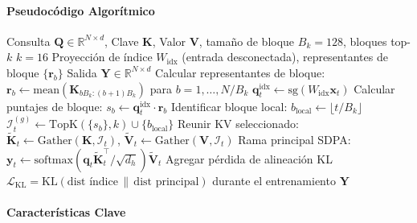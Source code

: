 \paragraph{Pseudocódigo Algorítmico}

\begin{algorithm}[H]
\caption{MSA: Atención Dispersa MiniMax con Ramas de Índice + Principal}
\begin{algorithmic}[1]
\Require Consulta $\mathbf{Q} \in \mathbb{R}^{N \times d}$, Clave $\mathbf{K}$, Valor $\mathbf{V}$, tamaño de bloque $B_k = 128$, bloques top-$k$ $k = 16$
\Require Proyección de índice $W_{\text{idx}}$ (entrada desconectada), representantes de bloque $\{\mathbf{r}_b\}$
\Ensure Salida $\mathbf{Y} \in \mathbb{R}^{N \times d}$
\State Calcular representantes de bloque: $\mathbf{r}_b \gets \mathrm{mean}(\mathbf{K}_{bB_k:(b+1)B_k})$ para $b = 1, \ldots, N/B_k$
        \State $\mathbf{q}_t^{\text{idx}} \gets \mathrm{sg}(W_{\text{idx}} \mathbf{x}_t)$ 
        \State Calcular puntajes de bloque: $s_b \gets \mathbf{q}_t^{\text{idx}} \cdot \mathbf{r}_b$
        \State Identificar bloque local: $b_{\text{local}} \gets \lfloor t / B_k \rfloor$
        \State $\mathcal{I}_t^{(g)} \gets \mathrm{TopK}(\{s_b\}, k) \cup \{b_{\text{local}}\}$ 
    \EndFor
    \State Reunir KV seleccionado: $\tilde{\mathbf{K}}_t \gets \mathrm{Gather}(\mathbf{K}, \mathcal{I}_t)$, $\tilde{\mathbf{V}}_t \gets \mathrm{Gather}(\mathbf{V}, \mathcal{I}_t)$
    \State Rama principal SDPA: $\mathbf{y}_t \gets \mathrm{softmax}(\mathbf{q}_t \tilde{\mathbf{K}}_t^\top / \sqrt{d_h}) \tilde{\mathbf{V}}_t$
\EndFor
\State Agregar pérdida de alineación KL $\mathcal{L}_{\text{KL}} = \mathrm{KL}(\text{dist índice} \,\|\, \text{dist principal})$ durante el entrenamiento
\Return $\mathbf{Y}$
\end{algorithmic}
\end{algorithm}

\paragraph{Características Clave}

